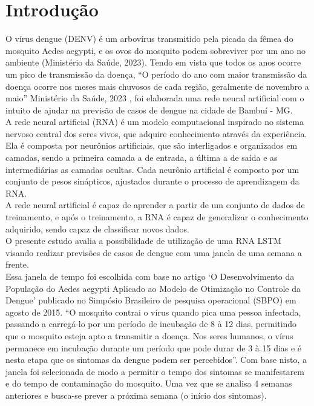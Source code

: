 \documentclass[
	article,			%
	11pt,				%
	a4paper,			%
	chapter=TITLE,		%
	section=TITLE,		%
	subsection=TITLE,	%
	subsubsection=TITLE %
	english,			%
	brazil,				%
	sumario=tradicional
	]{abntex2}
\begin{document}
\section{Introdução}

O vírus dengue (DENV) é um arbovírus transmitido pela picada da fêmea do mosquito Aedes aegypti, 
e os ovos do mosquito podem sobreviver por um ano no ambiente (Ministério da Saúde, 2023). 
Tendo em vista que todos os anos ocorre um pico de transmissão da doença, “O período do ano com maior transmissão da doença ocorre nos meses mais chuvosos de cada região, geralmente de novembro a maio” Ministério da Saúde, 2023
, foi elaborada uma rede neural artificial com o intuito de ajudar na previsão de casos de dengue na cidade de Bambuí - MG.
\\
\indent
A rede neural artificial (RNA) é um modelo computacional inspirado no sistema nervoso central dos seres vivos, que adquire conhecimento através da experiência. Ela é composta por neurônios artificiais, que são interligados e organizados em camadas, sendo a primeira camada a de entrada, a última a de saída e as intermediárias as camadas ocultas. Cada neurônio artificial é composto por um conjunto de pesos sinápticos, ajustados durante o processo de aprendizagem da RNA.
\\ \indent A rede neural artificial é capaz de aprender a partir de um conjunto de dados de treinamento, e após o treinamento, a RNA é capaz de generalizar o conhecimento adquirido, sendo capaz de classificar novos dados.
\\ \indent
O presente estudo avalia a possibilidade de utilização de uma RNA LSTM visando realizar previsões de casos de dengue com uma janela de uma semana a frente.
\\ \indent
Essa janela de tempo foi escolhida com base no artigo ‘O Desenvolvimento da População do Aedes aegypti Aplicado ao Modelo de Otimização no Controle da Dengue’ 
publicado no Simpósio Brasileiro de pesquisa operacional (SBPO) em agosto de 2015. 
“O mosquito contrai o vírus quando pica uma pessoa infectada, passando a carregá-lo por um período de incubação de 8 à 12 dias,
 permitindo que o mosquito esteja apto a transmitir a doença. 
 Nos seres humanos, o vírus permanece em incubação durante um período que pode durar de 3 à 15 dias e é nesta etapa que os
 sintomas da dengue podem ser percebidos”. Com base nisto, a janela foi selecionada de modo a permitir o tempo dos sintomas
 se manifestarem e do tempo de contaminação do mosquito. Uma vez que se analisa 4 semanas anteriores e busca-se prever a próxima semana 
 (o início dos sintomas).
\end{document}
